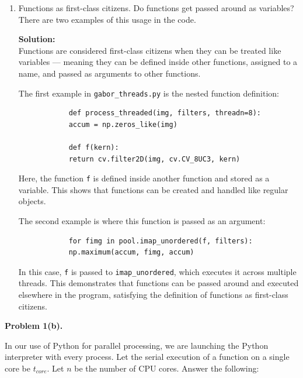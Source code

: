 \documentclass[11pt]{article}
\begin{document}
\begin{enumerate}
		\item[iii.] Functions as first-class citizens. Do functions get passed around as variables? There are two examples of this usage in the code.
		
		\textbf{Solution:}\\
		Functions are considered first-class citizens when they can be treated like variables — meaning they can be defined inside other functions, assigned to a name, and passed as arguments to other functions.
		
		The first example in \texttt{gabor\_threads.py} is the nested function definition:
		
		\begin{verbatim}
			def process_threaded(img, filters, threadn=8):
			accum = np.zeros_like(img)
			
			def f(kern):
			return cv.filter2D(img, cv.CV_8UC3, kern)
		\end{verbatim}
		
		Here, the function \texttt{f} is defined inside another function and stored as a variable. This shows that functions can be created and handled like regular objects.
		
		The second example is where this function is passed as an argument:
		
		\begin{verbatim}
			for fimg in pool.imap_unordered(f, filters):
			np.maximum(accum, fimg, accum)
		\end{verbatim}
		
		In this case, \texttt{f} is passed to \texttt{imap\_unordered}, which executes it across multiple threads. This demonstrates that functions can be passed around and executed elsewhere in the program, satisfying the definition of functions as first-class citizens.
		
	\end{enumerate}
	
	\newpage
	
	\textbf{Problem 1(b).}
	
	In our use of Python for parallel processing, we are launching the Python interpreter with every process. Let the serial execution of a function on a single core be $t_{core}$. Let $n$ be the number of CPU cores. Answer the following:
	
\end{document}
